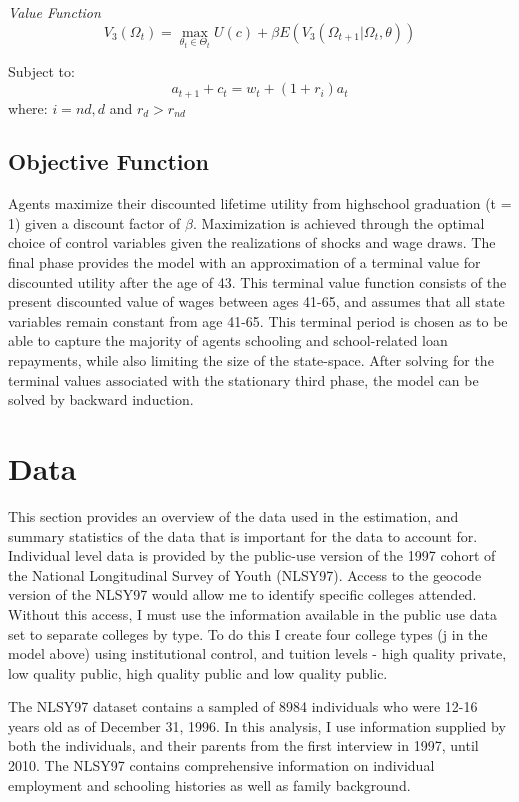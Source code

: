 \documentclass[letterpaper,12pt]{article}
\begin{document}
\noindent \emph{Value Function}
\begin{equation}
V_3 (\Omega_t) = \max_{\theta_t \in \Theta_t} U(c) + \beta E (V_3(\Omega_{t+1}| \Omega_t, \theta))
\end{equation}

Subject to:
\begin{equation}
a_{t+1} + c_t = w_t + (1+r_i) a_t
\end{equation}
where: $i = nd, d$ and $r_{d} > r_{nd}$

\subsection{Objective Function}

Agents maximize their discounted lifetime utility from highschool graduation (t = 1) given a discount factor of $\beta$. Maximization is achieved through the optimal choice of control variables given the realizations of shocks and wage draws. The final phase provides the model with an approximation of a terminal value for discounted utility after the age of 43. This terminal value function consists of the present discounted value of wages between ages 41-65, and assumes that all state variables remain constant from age 41-65. This terminal period is chosen as to be able to capture the majority of agents schooling and school-related loan repayments, while also limiting the size of the state-space. After solving for the terminal values associated with the stationary third phase, the model can be solved by backward induction.

\section{Data}

This section provides an overview of the data used in the estimation, and summary statistics of the data that is important for the data to account for. Individual level data is provided by the public-use version of the 1997 cohort of the National Longitudinal Survey of Youth (NLSY97). Access to the geocode version of the NLSY97 would allow me to identify specific colleges attended. Without this access, I must use the information available in the public use data set to separate colleges by type. To do this I create four college types (j in the model above) using institutional control, and tuition levels - high quality private, low quality public, high quality public and low quality public.

The NLSY97 dataset contains a sampled of 8984 individuals who were 12-16 years old as of December 31, 1996. In this analysis, I use information supplied by both the individuals, and their parents from the first interview in 1997, until 2010. The NLSY97 contains comprehensive information on individual employment and schooling histories as well as family background. 
\end{document}
